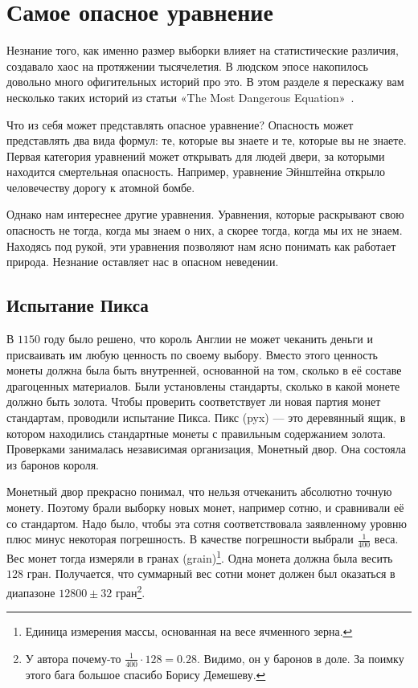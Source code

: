 \documentclass[12pt, a4paper, oneside]{article}
\begin{document}
\section{Самое опасное уравнение}

Незнание того, как именно размер выборки влияет на статистические различия, создавало хаос на протяжении тысячелетия. В людском эпосе накопилось довольно много офигительных историй про это. В этом разделе я перескажу вам несколько таких историй из статьи «The Most Dangerous Equation»~\cite{ref:zmde}. 

Что из себя может представлять опасное уравнение? Опасность может представлять два вида формул: те, которые вы знаете и те, которые вы не знаете. Первая категория уравнений может открывать для людей двери, за которыми находится смертельная опасность. Например, уравнение Эйнштейна открыло человечеству дорогу к атомной бомбе. 

Однако нам интереснее другие уравнения. Уравнения, которые раскрывают свою опасность не тогда, когда мы знаем о них, а скорее тогда, когда мы их не знаем. Находясь под рукой, эти уравнения позволяют нам ясно понимать как работает природа. Незнание оставляет нас в опасном неведении. 

\subsection{Испытание Пикса}

В $1150$ году было решено, что король Англии не может чеканить деньги и присваивать им любую ценность по своему выбору. Вместо этого ценность монеты должна была быть внутренней, основанной на том, сколько в её составе драгоценных материалов. Были установлены стандарты, сколько в какой монете должно быть золота. Чтобы проверить соответствует ли новая партия монет стандартам, проводили испытание Пикса. Пикс (pyx) --- это деревянный ящик, в котором находились стандартные монеты с правильным содержанием золота. Проверками занималась независимая организация, Монетный двор. Она состояла из баронов короля.

Монетный двор прекрасно понимал, что нельзя отчеканить абсолютно точную монету. Поэтому брали выборку новых монет, например сотню, и сравнивали её со стандартом. Надо было, чтобы эта сотня соответствовала заявленному уровню плюс минус некоторая погрешность. В качестве погрешности выбрали $\frac{1}{400}$ веса. Вес монет тогда измеряли в гранах (grain)\footnote{Единица измерения массы, основанная на весе ячменного зерна.}. Одна монета должна была весить $128$ гран. Получается, что суммарный вес сотни монет должен был оказаться в диапазоне $12800 \pm 32$ гран\footnote{У автора почему-то $ \tfrac{1}{400}\cdot 128 = 0.28.$ Видимо, он у баронов в доле. За поимку этого бага большое спасибо Борису Демешеву.}. 
\end{document}
